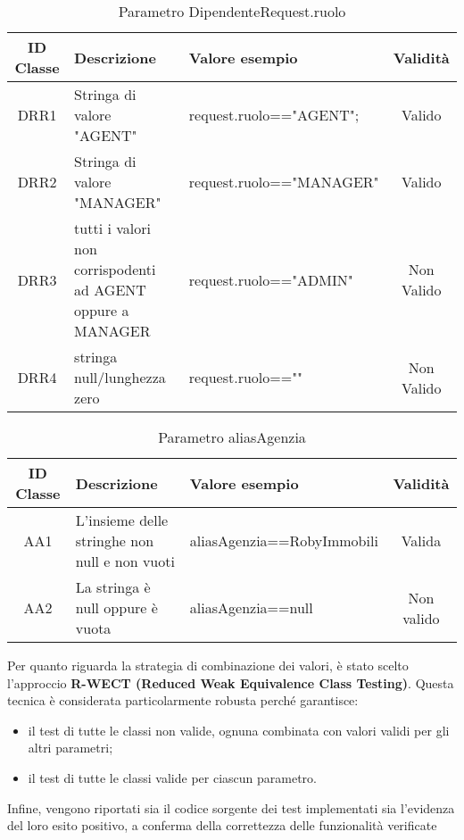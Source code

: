 \begin{table}[H]
	\centering
	\begin{tabular}{|c|p{4cm}|p{5cm}|c|} 
		\hline
		\textbf{ID Classe} & \textbf{Descrizione} & \textbf{Valore esempio} & \textbf{Validità} \\
		\hline
		DRR1 & Stringa di valore "AGENT"
		& request.ruolo=="AGENT"; & Valido \\
		\hline
		DRR2 & Stringa di valore "MANAGER"
		& request.ruolo=="MANAGER" & Valido \\
		\hline
		DRR3 & tutti i valori non corrispodenti ad AGENT oppure a MANAGER
		& request.ruolo=="ADMIN" & Non Valido \\
		\hline
		DRR4 & stringa null/lunghezza zero
		& request.ruolo=="" & Non Valido \\
		\hline
	\end{tabular}
	\caption{Parametro DipendenteRequest.ruolo}
	\label{tab:placeholder}
\end{table}

\begin{table}[H]
	\centering
	\begin{tabular}{|c|p{4cm}|p{5cm}|c|} 
		\hline
		\textbf{ID Classe} & \textbf{Descrizione} & \textbf{Valore esempio} & \textbf{Validità} \\
		\hline
		AA1 & L'insieme delle stringhe non null e non vuoti & aliasAgenzia==RobyImmobili & Valida \\
		\hline
		AA2 & La stringa è null oppure è vuota & aliasAgenzia==null & Non valido \\
		\hline
	\end{tabular}
	\caption{Parametro aliasAgenzia}
	\label{tab:placeholder}
\end{table}

\vspace{1cm}

Per quanto riguarda la strategia di combinazione dei valori, è stato scelto l’approccio \textbf{R-WECT (Reduced Weak Equivalence Class Testing)}. Questa tecnica è considerata particolarmente robusta perché garantisce:

\begin{itemize}
	\item il test di tutte le classi non valide, ognuna combinata con valori validi per gli altri parametri;
	\item il test di tutte le classi valide per ciascun parametro.
\end{itemize}

Infine, vengono riportati sia il codice sorgente dei test implementati sia l’evidenza del loro esito positivo, a conferma della correttezza delle funzionalità verificate




